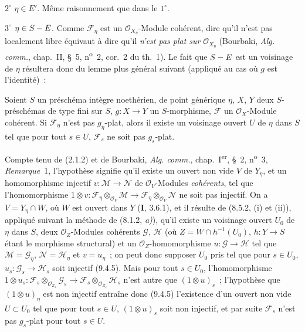 $2^\circ$ $\eta\in E'$. Même raisonnement que dans le $1^\circ$.

$3^\circ$ $\eta\in S- E$. Comme $\mathcal F_\eta$ est un
$\mathcal O_{X_\eta}$-Module cohérent, dire qu'il n'est pas localement libre
équivaut à dire qu'il \emph{n'est pas plat sur} $\mathcal O_{X_\eta}$
(Bourbaki, \emph{Alg. comm.}, chap.~II, \S~5, n\textsuperscript{o}~2,
cor.~2 du th.~1). Le fait que $S- E$ est un voisinage de $\eta$ résultera donc
du lemme plus général suivant (appliqué au cas où $g$ est l'identité)~:

\begin{lemma}[9.4.7.1]
\label{IV.9.4.7.1-fr}
Soient $S$ un préschéma intègre noethérien, de point générique $\eta$, $X$,
$Y$ deux $S$-préschémas de type fini sur $S$, $g:X\to Y$ un $S$-morphisme,
$\mathcal F$ un $\mathcal O_X$-Module cohérent. Si $\mathcal F_\eta$ n'est
pas $g_\eta$-plat, alors il existe un voisinage ouvert $U$ de $\eta$ dans $S$
tel que pour tout $s\in U$, $\mathcal F_s$ ne soit pas $g_s$-plat.
\end{lemma}

Compte tenu de (2.1.2) et de Bourbaki, \emph{Alg. comm.}, chap.~I\textsuperscript{er},
\S~2, n\textsuperscript{o}~3, \emph{Remarque}~1, l'hypothèse signifie qu'il existe un
ouvert non vide $V$ de $Y_\eta$, et un homomorphisme injectif
$v:\mathcal M\to\mathcal N$ de $\mathcal O_V$-Modules \emph{cohérents}, tel
que l'homomorphisme
$1\otimes v:\mathcal F_\eta\otimes_{\mathcal O_V}\mathcal M\to
\mathcal F_\eta\otimes_{\mathcal O_V}\mathcal N$ ne soit pas injectif. On a
$V=Y_\eta\cap W$, où $W$ est ouvert dans $Y$ (\textbf{I}, 3.6.1), et il
résulte de (8.5.2, (i) et (ii)), appliqué suivant la méthode de
(8.1.2, \emph{a)}), qu'il existe un voisinage ouvert $U_0$ de $\eta$ dans $S$,
deux $\mathcal O_Z$-Modules
cohérents $\mathcal G$, $\mathcal H$ (où $Z=W\cap h^{-1}(U_0)$,
$h:Y\to S$ étant le morphisme structural) et un $\mathcal O_Z$-homomorphisme
$u:\mathcal G\to\mathcal H$ tel que $\mathcal M=\mathcal G_\eta$,
$\mathcal N=\mathcal H_\eta$ et $v=u_\eta$~; on peut donc supposer $U_0$ pris
tel que pour $s\in U_0$, $u_s:\mathcal G_s\to\mathcal H_s$ soit injectif
(9.4.5). Mais pour tout $s\in U_0$, l'homomorphisme
$1\otimes u_s:\mathcal F_s\otimes_{\mathcal O_{Z_s}}\mathcal G_s\to
\mathcal F_s\otimes_{\mathcal O_{Z_s}}\mathcal H_s$ n'est autre que
$(1\otimes u)_s$~; l'hypothèse que $(1\otimes u)_\eta$ est non injectif
entraîne donc (9.4.5) l'existence d'un ouvert non vide $U\subset U_0$ tel que
pour tout $s\in U$, $(1\otimes u)_s$ soit non injectif, et par suite
$\mathcal F_s$ n'est pas $g_s$-plat pour tout $s\in U$.

